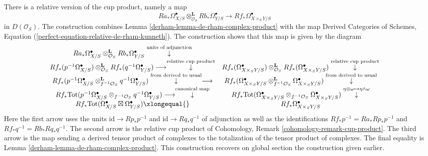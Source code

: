 There is a relative version of the cup product, namely a map
$$
Ra_*\Omega^\bullet_{X/S}
\otimes_{\mathcal{O}_S}^\mathbf{L}
Rb_*\Omega^\bullet_{Y/S}
\longrightarrow
Rf_*\Omega^\bullet_{X \times_S Y/S}
$$
in $D(\mathcal{O}_S)$. The construction combines
Lemma \ref{derham-lemma-de-rham-complex-product} with the map
Derived Categories of Schemes, Equation
(\ref{perfect-equation-relative-de-rham-kunneth}).
The construction shows that this map is given by the diagram
$$
\begin{array}{cc}Ra_*\Omega^\bullet_{X/S}
\otimes_{\mathcal{O}_S}^\mathbf{L}
Rb_*\Omega^\bullet_{Y/S}
\overset{\text{units of adjunction}}{\downarrow} &  \\ Rf_*(p^{-1}\Omega^\bullet_{X/S})
\otimes_{\mathcal{O}_S}^\mathbf{L}
Rf_*(q^{-1}\Omega^\bullet_{Y/S}) \longrightarrow\overset{\text{relative cup product}}{\downarrow} & Rf_*(\Omega^\bullet_{X \times_S Y/S})
\otimes_{\mathcal{O}_S}^\mathbf{L}
Rf_*(\Omega^\bullet_{X \times_S Y/S}) \overset{\text{relative cup product}}{\downarrow} \\ Rf_*(p^{-1}\Omega^\bullet_{X/S}
\otimes_{f^{-1}\mathcal{O}_S}^\mathbf{L}
q^{-1}\Omega^\bullet_{Y/S})
\overset{\text{from derived to usual}}{\downarrow}\longrightarrow & Rf_*(\Omega^\bullet_{X \times_S Y/S}
\otimes_{f^{-1}\mathcal{O}_S}^\mathbf{L}
\Omega^\bullet_{X \times_S Y/S})
\overset{\text{from derived to usual}}{\downarrow} \\ Rf_*\text{Tot}(p^{-1}\Omega^\bullet_{X/S}
\otimes_{f^{-1}\mathcal{O}_S}
q^{-1}\Omega^\bullet_{Y/S}) \longrightarrow\overset{\text{canonical map}}{\downarrow} & Rf_*\text{Tot}(\Omega^\bullet_{X \times_S Y/S}
\otimes_{f^{-1}\mathcal{O}_S}
\Omega^\bullet_{X \times_S Y/S})
\overset{\eta \otimes \omega \mapsto \eta \wedge \omega}{\downarrow} \\ Rf_*\text{Tot}(\Omega^\bullet_{X/S} \boxtimes \Omega^\bullet_{Y/S})
\xlongequal{} & Rf_*\Omega^\bullet_{X \times_S Y/S}\end{array}
$$
Here the first arrow uses the units $\text{id} \to Rp_* p^{-1}$
and $\text{id} \to Rq_* q^{-1}$ of adjunction as well as the
identifications $Rf_* p^{-1} = Ra_* Rp_* p^{-1}$ and
$Rf_* q^{-1} = Rb_* Rq_* q^{-1}$.
The second arrow is the relative cup product of
Cohomology, Remark \ref{cohomology-remark-cup-product}.
The third arrow is the map sending a derived tensor product
of complexes to the totalization of the tensor product of complexes.
The final equality is Lemma \ref{derham-lemma-de-rham-complex-product}.
This construction recovers on global section the construction given earlier.

